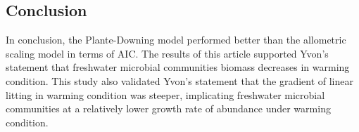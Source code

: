 \documentclass[11pt]{article}
\begin{document}
\begin{linenumbers}
\section*{Conclusion}
In conclusion, the Plante-Downing model performed better than the allometric scaling model in terms of AIC. The results of this article supported Yvon's statement that freshwater microbial communities biomass decreases in warming condition. This study also validated Yvon's statement that the gradient of linear litting in warming condition was steeper, implicating freshwater microbial communities at a relatively lower growth rate of abundance under warming condition.



\newpage




\end{linenumbers}
\end{document}
